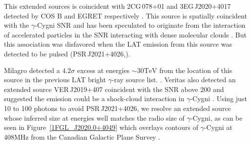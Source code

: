\documentclass[12pt,preprint]{aastex}
\newcommand{\gev}{\text{GeV}\xspace}
\newcommand{\tev}{\text{TeV}\xspace}
\newcommand{\hl}[1]{#1}
\begin{document}
\hl{
This extended sources is coincident with 2CG\,078+01 and
3EG\,J2020+4017 detected by COS B and EGRET respectively
\citep{second_cos_b_catalog,third_egret_catalog}.  This source is
spatially coincident with the $\gamma$-Cygni SNR and has been speculated
to originate from 
the interaction of accelerated particles in the SNR interacting
with dense molecular clouds \citep{pollock_1985,gaisser_1998}.  But this
association was disfavored when the LAT \gev emission from this source
was detected to be pulsed 
(PSR\,J2021+4026,\cite{first_lat_pulsar_cat}).

Milagro detected a $4.2\sigma$ excess at energies $\sim 30 \tev$ from the
location of this source in the previous LAT bright $\gamma$-ray source
list. \cite{lat_bsl,milagro_bright_source_list}.  Veritas also detected
an extended source VER\,J2019+407 coincident with the SNR above 200 \gev
and suggested the \tev emission could be a shock-cloud interaction in
$\gamma$-Cygni \citep{veritas_gamma_cygni}.  Using just 10 \gev to 100
\gev photons to avoid PSR\,J2021+4026, we resolve an extended source
whose inferred size at \gev energies well matches the radio size of
$\gamma$-Cygni, as can be seen in Figure~\ref{1FGL_J2020.0+4049} which
overlays contours of $\gamma$-Cygni at 408MHz from the Canadian Galactic
Plane Survey \citep{canadian_galactic_plane_survey}.
}



\end{document}
